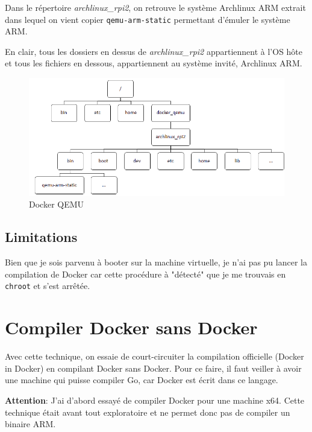 \documentclass[11pt,a4paper,oneside]{report}
\newcommand{\code}[1]{\texttt{#1}} %
\begin{document}
Dans le répertoire \textit{archlinux\_rpi2}, on retrouve le système Archlinux ARM extrait dans lequel on vient copier \code{qemu-arm-static} permettant d'émuler le système ARM.

En clair, tous les dossiers en dessus de \textit{archlinux\_rpi2} appartiennent à l'OS hôte et tous les fichiers en dessous, appartiennent au système invité, Archlinux ARM.

\begin{figure}
\begin{center}
        \includegraphics[scale=0.75]{img/chroot_archlinux_rpi}
        \caption{Docker QEMU}
        \label{fig_chroot_qemu}
    \end{center}
\end{figure}


\subsection{Limitations}

Bien que je sois parvenu à booter sur la machine virtuelle, je n'ai pas pu lancer la compilation de Docker car cette procédure à "détecté" que je me trouvais en \code{chroot} et s'est arrêtée.

\section{Compiler Docker sans Docker}

Avec cette technique, on essaie de court-circuiter la compilation officielle (Docker in Docker) en compilant Docker sans Docker. Pour ce faire, il faut veiller à avoir une machine qui puisse compiler Go, car Docker est écrit dans ce langage.

\textbf{Attention}: J'ai d'abord essayé de compiler Docker pour une machine x64. Cette technique était avant tout exploratoire et ne permet donc pas de compiler un binaire ARM.
\end{document}
